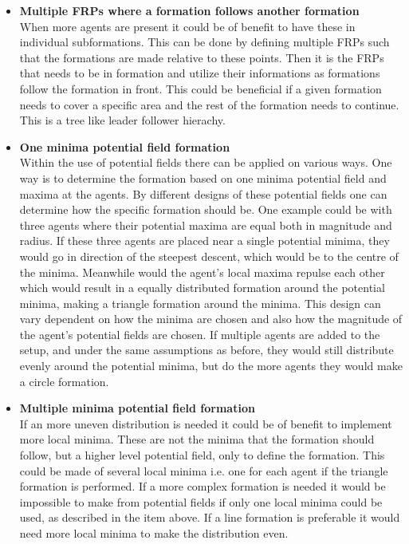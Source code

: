 \begin{itemize}
\item \textbf{Multiple \ac{FRP}s where a formation follows another formation}\\
When more agents are present it could be of benefit to have these in individual subformations. This can be done by defining multiple \ac{FRP}s such that the formations are made relative to these points. Then it is the \ac{FRP}s that needs to be in formation and utilize their informations as formations follow the formation in front. This could be beneficial if a given formation needs to cover a specific area and the rest of the formation needs to continue. This is a tree like leader follower hierachy.
\item \textbf{One minima potential field formation}\\
Within the use of potential fields there can be applied on various ways. One way is to determine the formation based on one minima potential field and maxima at the agents. By different designs of these potential fields one can determine how the specific formation should be. One example could be with three agents where their potential maxima are equal both in magnitude and radius. If these three agents are placed near a single potential minima, they would go in direction of the steepest descent, which would be to the centre of the minima. Meanwhile would the agent's local maxima repulse each other which would result in a equally distributed formation around the potential minima, making a triangle formation around the minima.
This design can vary dependent on how the minima are chosen and also how the magnitude of the agent's potential fields are chosen. If multiple agents are added to the setup, and under the same assumptions as before, they would still distribute evenly around the potential minima, but do the more agents they would make a circle formation. 
\item \textbf{Multiple minima potential field formation}\\
If an more uneven distribution is needed it could be of benefit to implement more local minima. These are not the minima that the formation should follow, but a higher level potential field, only to define the formation. This could be made of several local minima i.e. one for each agent if the triangle formation is performed. If a more complex formation is needed it would be impossible to make from potential fields if only one local minima could be used, as described in the item above. If a line formation is preferable it would need more local minima to make the distribution even.

\end{itemize}
